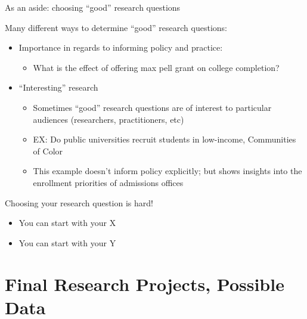 \documentclass[
  8pt,
  ignorenonframetext,
  dvipsnames]{beamer}
\providecommand{\tightlist}{%
  \setlength{\itemsep}{0pt}\setlength{\parskip}{0pt}}
\let\olditem\item
\renewcommand{\item}{%
  \olditem\vspace{4pt}
}
\begin{document}
\begin{frame}{As an aside: choosing ``good'' research questions}
\protect\hypertarget{as-an-aside-choosing-good-research-questions}{}

Many different ways to determine ``good'' research questions:

\begin{itemize}
\tightlist
\item
  Importance in regards to informing policy and practice:

  \begin{itemize}
  \tightlist
  \item
    What is the effect of offering max pell grant on college completion?
  \end{itemize}
\item
  ``Interesting'' research

  \begin{itemize}
  \tightlist
  \item
    Sometimes ``good'' research questions are of interest to particular
    audiences (researchers, practitioners, etc)
  \item
    EX: Do public universities recruit students in low-income,
    Communities of Color
  \item
    This example doesn't inform policy explicitly; but shows insights
    into the enrollment priorities of admissions offices
  \end{itemize}
\end{itemize}

\medskip

Choosing your research question is hard!

\begin{itemize}
\tightlist
\item
  You can start with your X
\item
  You can start with your Y
\end{itemize}

\end{frame}

\hypertarget{final-research-projects-possible-data}{%
\section{Final Research Projects, Possible
Data}\label{final-research-projects-possible-data}}
\end{document}
